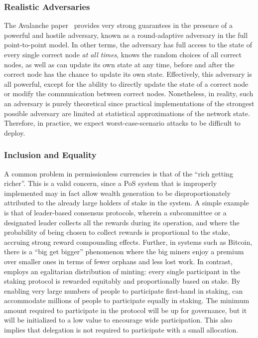\documentclass[runningheads]{llncs}
\begin{document}
\subsubsection{Realistic Adversaries}
The Avalanche paper~\cite{avalanche} provides very strong guarantees in the presence of a powerful and hostile adversary, known as a round-adaptive adversary in the full point-to-point model. 
In other terms, the adversary has full access to the state of every single correct node \emph{at all times}, knows the random choices of all correct nodes, as well as can update its own state at any time, before and after the correct node has the chance to update its own state. 
Effectively, this adversary is all powerful, except for the ability to directly update the state of a correct node or modify the communication between correct nodes. 
Nonetheless, in reality, such an adversary is purely theoretical since practical implementations of the strongest possible adversary are limited at statistical approximations of the network state. Therefore, in practice, we expect worst-case-scenario attacks to be difficult to deploy. 

\subsubsection{Inclusion and Equality}
A common problem in permissionless currencies is that of the ``rich getting richer''. This is a valid concern, since a PoS system that is improperly implemented may in fact allow wealth generation to be disproportionately attributed to the already large holders of stake in the system. A simple example is that of leader-based consensus protocols, wherein a subcommittee or a designated leader collects all the rewards during its operation, and where the probability of being chosen to collect rewards is proportional to the stake, accruing strong reward compounding effects. Further, in systems such as Bitcoin, there is a ``big get bigger'' phenomenon where the big miners enjoy a premium over smaller ones in terms of fewer orphans and less lost work.
In contrast, \AVAPlatformName{} employs an egalitarian distribution of minting: every single participant in the staking protocol is rewarded equitably and proportionally based on stake. By enabling very large numbers of people to participate first-hand in staking, \AVAPlatformName{} can accommodate millions of people to participate equally in staking. The minimum amount required to participate in the protocol will be up for governance, but it will be initialized to a low value to encourage wide participation. This also implies that delegation is not required to participate with a small allocation. 
\end{document}
